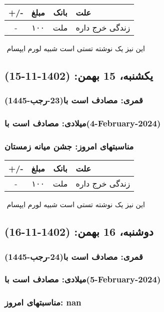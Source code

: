 \documentclass{article}
\newcommand{\rnote}[1]{\marginpar{\textcolor{color}{\StrSubstitute{\##1}{ }{\_}}}}
\newcommand{\myRow}[4]{
    #1 & #2 & #3 & #4 \\ \hline
}
\begin{document}
\begin{tabular}{ | c | c | c | p{5cm} |}
    \hline
    \myRow{ +/- }{مبلغ}{بانک}{علت}
    \myRow{-}{۱۰۰}{ملت}{زندگی خرج داره}
\end{tabular}
\newline
\newline

‌
\rnote{تست}
این نیز یک نوشته تستی است شبیه لورم ایپسام




\newpage
{}
\textcolor{color}{
\section{ یکشنبه، 15 بهمن: (1402-11-15) }
\subsubsection*{قمری: مصادف است با(23-رجب-1445)} 
\subsubsection*{میلادی: مصادف است با(4-February-2024)}
\subsubsection*{مناسبتهای امروز: جشن میانه زمستان}
}


\begin{tabular}{ | c | c | c | p{5cm} |}
    \hline
    \myRow{ +/- }{مبلغ}{بانک}{علت}
    \myRow{-}{۱۰۰}{ملت}{زندگی خرج داره}
\end{tabular}
\newline
\newline

‌
\rnote{تست}
این نیز یک نوشته تستی است شبیه لورم ایپسام




\newpage
{}
\textcolor{color}{
\section{ دوشنبه، 16 بهمن: (1402-11-16) }
\subsubsection*{قمری: مصادف است با(24-رجب-1445)} 
\subsubsection*{میلادی: مصادف است با(5-February-2024)}
\subsubsection*{مناسبتهای امروز: nan}
}
\end{document}
